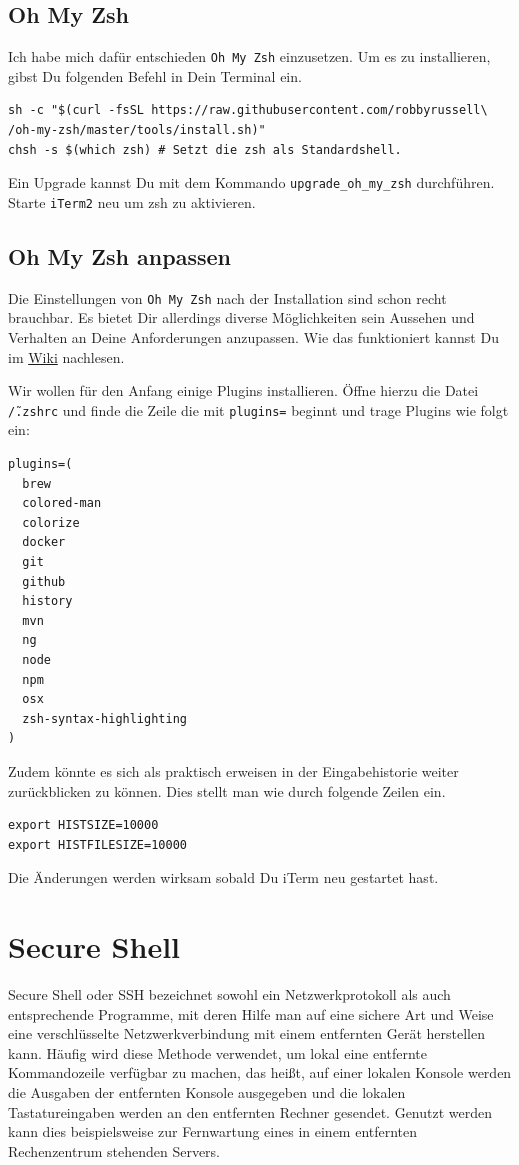 \documentclass[]{article}
\newcommand{\code}[1]{\texttt{#1}}
\begin{document}
\subsection{Oh My Zsh}
Ich habe mich dafür entschieden \code{Oh My Zsh} einzusetzen. Um es zu installieren, gibst Du folgenden Befehl in Dein Terminal ein.
\begin{verbatim}
sh -c "$(curl -fsSL https://raw.githubusercontent.com/robbyrussell\
/oh-my-zsh/master/tools/install.sh)"
chsh -s $(which zsh) # Setzt die zsh als Standardshell.
\end{verbatim}

Ein Upgrade kannst Du mit dem Kommando \code{upgrade\_oh\_my\_zsh} durchführen. Starte \code{iTerm2} neu um zsh zu aktivieren.

\subsection{Oh My Zsh anpassen}
Die Einstellungen von \code{Oh My Zsh} nach der Installation sind schon recht brauchbar. Es bietet Dir allerdings diverse Möglichkeiten sein Aussehen und Verhalten an Deine Anforderungen anzupassen. Wie das funktioniert kannst Du im \href{https://github.com/robbyrussell/oh-my-zsh/wiki}{Wiki} nachlesen.

Wir wollen für den Anfang einige Plugins installieren. Öffne hierzu die Datei \code{\~/.zshrc} und finde die Zeile die mit \code{plugins=} beginnt und trage Plugins wie folgt ein:
\begin{verbatim}
plugins=(
  brew 
  colored-man 
  colorize  
  docker 
  git 
  github 
  history 
  mvn 
  ng 
  node 
  npm 
  osx 
  zsh-syntax-highlighting
)
\end{verbatim}

Zudem könnte es sich als praktisch erweisen in der Eingabehistorie weiter zurückblicken zu können. Dies stellt man wie durch folgende Zeilen ein.

\begin{verbatim}
export HISTSIZE=10000
export HISTFILESIZE=10000
\end{verbatim}

Die Änderungen werden wirksam sobald Du iTerm neu gestartet hast.


\section{Secure Shell}
Secure Shell oder SSH bezeichnet sowohl ein Netzwerkprotokoll als auch entsprechende Programme, mit deren Hilfe man auf eine sichere Art und Weise eine verschlüsselte Netzwerkverbindung mit einem entfernten Gerät herstellen kann. Häufig wird diese Methode verwendet, um lokal eine entfernte Kommandozeile verfügbar zu machen, das heißt, auf einer lokalen Konsole werden die Ausgaben der entfernten Konsole ausgegeben und die lokalen Tastatureingaben werden an den entfernten Rechner gesendet. Genutzt werden kann dies beispielsweise zur Fernwartung eines in einem entfernten Rechenzentrum stehenden Servers.\cite{wikipediaSecureShell}
\end{document}
